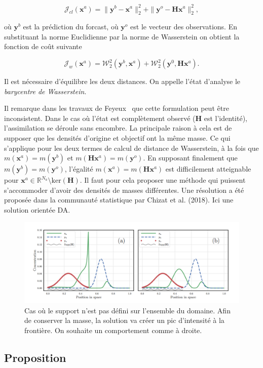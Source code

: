 \documentclass{article}
\newcommand{\norm}[1]{\|#1\|}
\newcommand{\bH}{\bm{H}}
\newcommand{\bx}{\bm{x}}
\newcommand{\by}{\bm{y}}
\begin{document}
$$
    \mathcal J_{cl}(\bx^a) = \norm{\by^b - \bx^a}_2^2 + \norm{\by^o - \bH \bx^a}_2^2,
$$

où $\by^b$ est la prédiction du forcast, où $\by^o$ est le vecteur des observations.
En substituant la norme Euclidienne par la norme de Wasserstein on obtient la fonction de coût suivante

$$
    \mathcal J_{w}(\bx^a) = \mathcal W_2^2(\bm y^b, \bx^a) +  \mathcal W_2^2(\bm y^0, \bH \bx^a).
$$

Il est nécessaire d'équilibre les deux distances. On appelle l'état d'analyse le \textit{barycentre de Wasserstein}.

Il remarque dans les travaux de Feyeux~\cite{feyeux_transport_nodate} que cette formulation peut être inconsistent. Dans le cas où l'état est complètement observé ($\bH$ est l'identité), l'assimilation se déroule sans encombre.
La principale raison à cela est de supposer que les densités d'origine et objectif ont la même masse. Ce qui s'applique pour les deux termes de calcul de distance de Wasserstein, à la fois que $m(\bx^a) = m(\by^b)$ et $m(\bH \bx^a) = m(\by^o)$. En supposant finalement que $m(\by^b) = m(\by^o)$, l'égalité $m(\bx^a)=m(\bH \bx^a)$ est difficilement atteignable pour $\bx^a \in \mathbb R^{N_a} \setminus \text{ker}(\bH)$.
Il faut pour cela proposer une méthode qui puissent s’accommoder d'avoir des densités de masses différentes. Une résolution a été proposée dans la communauté statistique par Chizat et al. (2018). Ici une solution orientée DA.

\begin{figure}[h]
    \centering
    \includegraphics[width=\linewidth]{unbalanced_otda.png}
    \caption{Cas où le support n'est pas défini sur l'ensemble du domaine. Afin de conserver la masse, la solution va créer un pic d'intensité à la frontière. On souhaite un comportement comme à droite.}
    \label{fig:unbalance_otda}
\end{figure}

\subsection{Proposition}
\end{document}
